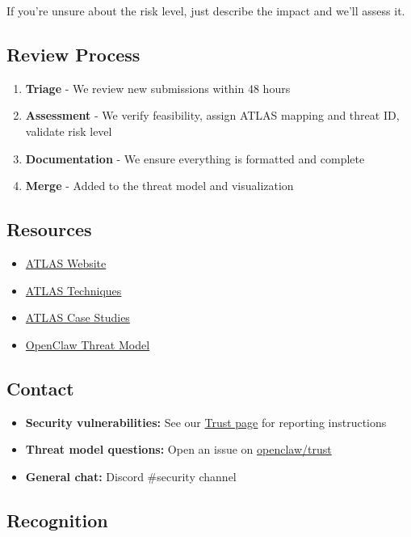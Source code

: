 If you're unsure about the risk level, just describe the impact and we'll assess it.

\subsection{Review Process}


\begin{enumerate}
  \item \textbf{Triage} - We review new submissions within 48 hours
  \item \textbf{Assessment} - We verify feasibility, assign ATLAS mapping and threat ID, validate risk level
  \item \textbf{Documentation} - We ensure everything is formatted and complete
  \item \textbf{Merge} - Added to the threat model and visualization
\end{enumerate}


\subsection{Resources}


\begin{itemize}
  \item \href{https://atlas.mitre.org/}{ATLAS Website}
  \item \href{https://atlas.mitre.org/techniques/}{ATLAS Techniques}
  \item \href{https://atlas.mitre.org/studies/}{ATLAS Case Studies}
  \item \href{./THREAT-MODEL-ATLAS.md}{OpenClaw Threat Model}
\end{itemize}


\subsection{Contact}


\begin{itemize}
  \item \textbf{Security vulnerabilities:} See our \href{https://trust.openclaw.ai}{Trust page} for reporting instructions
  \item \textbf{Threat model questions:} Open an issue on \href{https://github.com/openclaw/trust/issues}{openclaw/trust}
  \item \textbf{General chat:} Discord \#security channel
\end{itemize}


\subsection{Recognition}


